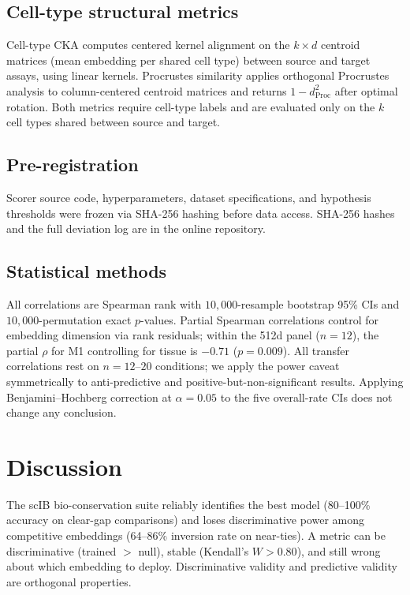 \documentclass[11pt]{article}
\begin{document}
\subsection{Cell-type structural metrics}

Cell-type CKA \citep{kornblith2019similarity} computes centered kernel alignment on the $k \times d$ centroid matrices (mean embedding per shared cell type) between source and target assays, using linear kernels. Procrustes similarity applies orthogonal Procrustes analysis to column-centered centroid matrices and returns $1 - d_{\mathrm{Proc}}^2$ after optimal rotation. Both metrics require cell-type labels and are evaluated only on the $k$ cell types shared between source and target.

\subsection{Pre-registration}

Scorer source code, hyperparameters, dataset specifications, and hypothesis thresholds were frozen via SHA-256 hashing before data access. SHA-256 hashes and the full deviation log are in the online repository.

\subsection{Statistical methods}

All correlations are Spearman rank with $10{,}000$-resample bootstrap 95\% CIs and $10{,}000$-permutation exact $p$-values. Partial Spearman correlations control for embedding dimension via rank residuals; within the 512d panel ($n = 12$), the partial $\rho$ for M1 controlling for tissue is $-0.71$ ($p = 0.009$). All transfer correlations rest on $n = 12$--$20$ conditions; we apply the power caveat symmetrically to anti-predictive and positive-but-non-significant results. Applying Benjamini--Hochberg correction at $\alpha = 0.05$ to the five overall-rate CIs does not change any conclusion.


\section{Discussion}
\label{sec:discussion}

The scIB bio-conservation suite reliably identifies the best model (80--100\% accuracy on clear-gap comparisons) and loses discriminative power among competitive embeddings (64--86\% inversion rate on near-ties). A metric can be discriminative (trained $>$ null), stable (Kendall's $W > 0.80$), and still wrong about which embedding to deploy. Discriminative validity and predictive validity are orthogonal properties.
\end{document}
